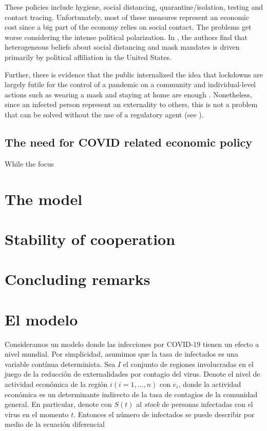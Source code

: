 \documentclass[11pt, oneside]{article}
\begin{document}
These policies include hygiene, social distancing, quarantine/isolation, testing and contact tracing. Unfortunately, most of these measures represent an economic cost since a big part of the economy relies on social contact. The problems get worse considering the intense political polarization. In \cite{makridis2020}, the authors find that heterogeneous beliefs about social distancing and mask mandates is driven primarily by political affiliation in the United States.

Further, there is evidence that the public internalized the idea that lockdowns are largely futile for the control of a pandemic on a community and individual-level actions such as wearing a mask and staying at home are enough \cite{gamlich2020}. Nonetheless, since an infected person represent an externality to others, this is not a problem that can be solved without the use of a regulatory agent (see \cite{Mas-colell}).




\subsection{The need for COVID related economic policy}

While the focus 

\section{The model} \label{model}


\section{Stability of cooperation}\label{IDP}

\section{Concluding remarks} \label{Conclude}


\section{El modelo} 

Consideramos un modelo donde las infecciones por COVID-19 tienen un efecto a nivel mundial. Por simplicidad, asumimos que la tasa de infectados es una variable contínua determinista. Sea $I$ el conjunto de regiones involucradas en el juego de la reducción de externalidades por contagio del virus. Denote el nivel de actividad económica de la región $i (i = 1,\dots,n)$ con $e_i$, donde la actividad económica es un determinante indirecto de la tasa de contagios de la comunidad general. En particular, denote con $S(t)$ al \emph{stock} de personas infectadas con el virus en el momento $t$. Entonces el número de infectados se puede describir por medio de la ecuación diferencial 
\end{document}
